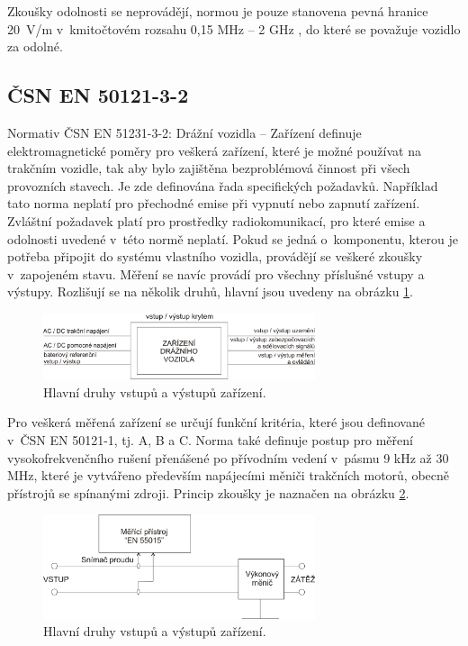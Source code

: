 Zkoušky odolnosti se neprovádějí, normou je pouze stanovena pevná hranice 20~V/m v~kmitočtovém rozsahu 0,15 MHz – 2 GHz , do které se považuje vozidlo za odolné.

\subsection{ČSN EN 50121-3-2}
Normativ ČSN EN 51231-3-2: Drážní vozidla – Zařízení definuje elektromagnetické poměry pro veškerá zařízení, které je možné používat na trakčním vozidle, tak aby bylo zajištěna bezproblémová činnost při všech provozních stavech. Je zde definována řada specifických požadavků. Například tato norma neplatí pro přechodné emise při vypnutí nebo zapnutí zařízení. Zvláštní požadavek platí pro prostředky radiokomunikací, pro které emise a odolnosti uvedené v~této normě neplatí. Pokud se jedná o~komponentu, kterou je potřeba připojit do systému vlastního vozidla, provádějí se veškeré zkoušky v~zapojeném stavu. Měření se navíc provádí pro všechny příslušné vstupy a výstupy. 
Rozlišují se na několik druhů, hlavní jsou uvedeny na obrázku \ref{obr:emc_IO}.

\begin{figure}[!h]
	\centering
	\includegraphics[width=8cm]{emc_IO.png}
	\caption{Hlavní druhy vstupů a výstupů zařízení.}
	\label{obr:emc_IO}
\end{figure}

Pro veškerá měřená zařízení se určují funkční kritéria, které jsou definované v~ČSN EN 50121-1, tj. A, B a C. Norma také definuje postup pro měření vysokofrekvenčního rušení přenášené po přívodním vedení v~pásmu 9 kHz až 30 MHz, které je vytvářeno především napájecími měniči trakčních motorů, obecně přístrojů se spínanými zdroji. Princip zkoušky je naznačen na obrázku \ref{obr:emc_vf}. 

\begin{figure}[!h]
	\centering
	\includegraphics[width=8cm]{emc_vf.png}
	\caption{Hlavní druhy vstupů a výstupů zařízení.}
	\label{obr:emc_vf}
\end{figure}


